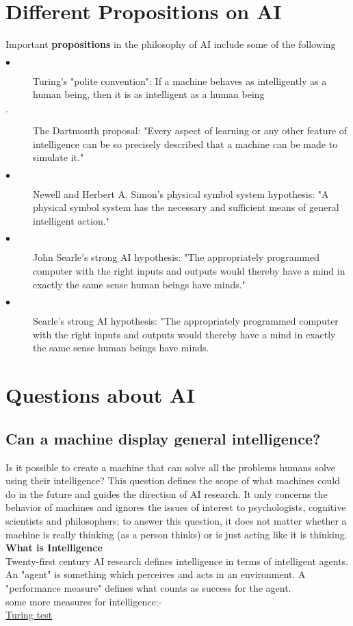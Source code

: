 \documentclass[12pt]{article}
\begin{document}
\section{Different Propositions on AI}
\small Important \textbf{propositions} in the philosophy of AI include some of the following
\begin{description}
\item[$\bullet$] Turing's "polite convention": If a machine behaves as intelligently as a human being, then it is as intelligent as a human being
\item[$\cdot$] The Dartmouth proposal: "Every aspect of learning or any other feature of intelligence can be so precisely described that a machine can be made to simulate it."
\item[$\bullet$] Newell and Herbert A. Simon's physical symbol system hypothesis: "A physical symbol system has the necessary and sufficient means of general intelligent action."
\item[$\bullet$] John Searle's strong AI hypothesis: "The appropriately programmed computer with the right inputs and outputs would thereby have a mind in exactly the same sense human beings have minds."
\item[$\bullet$] Searle's strong AI hypothesis: "The appropriately programmed computer with the right inputs and outputs would thereby have a mind in exactly the same sense human beings have minds.
\end{description}
\section{Questions about AI}
\small\subsection{Can a machine display general intelligence?}
Is it possible to create a machine that can solve all the problems humans solve using their intelligence? This question defines the scope of what machines could do in the future and guides the direction of AI research. It only concerns the behavior of machines and ignores the issues of interest to psychologists, cognitive scientists and philosophers; to answer this question, it does not matter whether a machine is really thinking (as a person thinks) or is just acting like it is thinking.\\
\textbf{What is Intelligence}\\
Twenty-first century AI research defines intelligence in terms of intelligent agents. An "agent" is something which perceives and acts in an environment. A "performance measure" defines what counts as success for the agent.\\
some more measures for intelligence:-\\
\textcolor{blue}{\href{https://en.wikipedia.org/wiki/Turing_test}{Turing test}}\\
\end{document}
